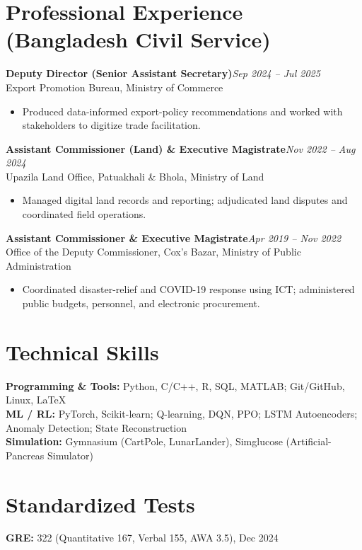 \documentclass[10pt,letterpaper]{article}
\newcommand{\position}[3]{%
  \textbf{#1}\hfill{\color{muted}\textit{#2}}\\
  {\color{dark}#3}\par\vspace{1pt}}
\begin{document}
\section[Professional Experience]{Professional Experience \textnormal{\small\color{muted}(Bangladesh Civil Service)}}
\position{Deputy Director (Senior Assistant Secretary)}{Sep 2024 -- Jul 2025}
{Export Promotion Bureau, Ministry of Commerce}
\begin{itemize}
  \item Produced data-informed export-policy recommendations and worked with stakeholders to digitize
  trade facilitation.
\end{itemize}
\vspace{3pt}
\position{Assistant Commissioner (Land) \& Executive Magistrate}{Nov 2022 -- Aug 2024}
{Upazila Land Office, Patuakhali \& Bhola, Ministry of Land}
\begin{itemize}
  \item Managed digital land records and reporting; adjudicated land disputes and coordinated field operations.
\end{itemize}
\vspace{3pt}
\position{Assistant Commissioner \& Executive Magistrate}{Apr 2019 -- Nov 2022}
{Office of the Deputy Commissioner, Cox's Bazar, Ministry of Public Administration}
\begin{itemize}
  \item Coordinated disaster-relief and COVID-19 response using ICT; administered public budgets, personnel,
  and electronic procurement.
\end{itemize}

\section{Technical Skills}
\textbf{Programming \& Tools:} Python, C/C++, R, SQL, MATLAB; Git/GitHub, Linux, LaTeX \\[2pt]
\textbf{ML / RL:} PyTorch, Scikit-learn; Q-learning, DQN, PPO; LSTM Autoencoders; Anomaly Detection; State Reconstruction \\[2pt]
\textbf{Simulation:} Gymnasium (CartPole, LunarLander), Simglucose (Artificial-Pancreas Simulator)

\section{Standardized Tests}
\textbf{GRE:} 322 (Quantitative 167, Verbal 155, AWA 3.5), Dec 2024
\end{document}
